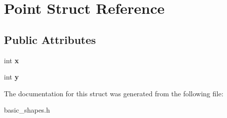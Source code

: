 \hypertarget{structPoint}{\section{Point Struct Reference}
\label{structPoint}
}
\subsection*{Public Attributes}
\begin{DoxyCompactItemize}
\item 
\hypertarget{structPoint_a8c779e11e694b20e0946105a9f5de842}{int {\bfseries x}}\label{structPoint_a8c779e11e694b20e0946105a9f5de842}

\item 
\hypertarget{structPoint_a2e1b5fb2b2a83571f5c0bc0f66a73cf7}{int {\bfseries y}}\label{structPoint_a2e1b5fb2b2a83571f5c0bc0f66a73cf7}

\end{DoxyCompactItemize}


The documentation for this struct was generated from the following file\-:\begin{DoxyCompactItemize}
\item 
basic\-\_\-shapes.\-h\end{DoxyCompactItemize}
